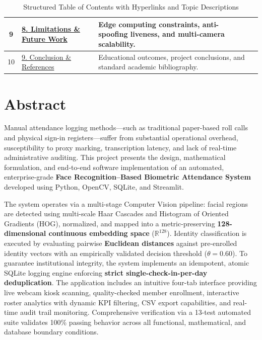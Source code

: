 \documentclass[12pt,a4paper]{article}
\begin{document}
\begin{table}[htbp]
\begin{tabularx}{\textwidth}{|c|p{4.2cm}|X|c|}
\hline
9 & \hyperref[sec:limitations]{8. Limitations \& Future Work} & Edge computing constraints, anti-spoofing liveness, and multi-camera scalability. & \pageref{sec:limitations} \\
\hline
10 & \hyperref[sec:conclusion]{9. Conclusion \& References} & Educational outcomes, project conclusions, and standard academic bibliography. & \pageref{sec:conclusion} \\
\hline
\end{tabularx}
\caption{Structured Table of Contents with Hyperlinks and Topic Descriptions}
\label{tab:index_table}
\end{table}

\newpage

\section*{Abstract}
\label{sec:abstract}

Manual attendance logging methods---such as traditional paper-based roll calls and physical sign-in registers---suffer from substantial operational overhead, susceptibility to proxy marking, transcription latency, and lack of real-time administrative auditing. This project presents the design, mathematical formulation, and end-to-end software implementation of an automated, enterprise-grade \textbf{Face Recognition--Based Biometric Attendance System} developed using Python, OpenCV, SQLite, and Streamlit. 

The system operates via a multi-stage Computer Vision pipeline: facial regions are detected using multi-scale Haar Cascades and Histogram of Oriented Gradients (HOG), normalized, and mapped into a metric-preserving \textbf{128-dimensional continuous embedding space} ($\mathbb{R}^{128}$). Identity classification is executed by evaluating pairwise \textbf{Euclidean distances} against pre-enrolled identity vectors with an empirically validated decision threshold ($\theta = 0.60$). To guarantee institutional integrity, the system implements an idempotent, atomic SQLite logging engine enforcing \textbf{strict single-check-in-per-day deduplication}. The application includes an intuitive four-tab interface providing live webcam kiosk scanning, quality-checked member enrollment, interactive roster analytics with dynamic KPI filtering, CSV export capabilities, and real-time audit trail monitoring. Comprehensive verification via a 13-test automated suite validates 100\% passing behavior across all functional, mathematical, and database boundary conditions.
\end{document}
